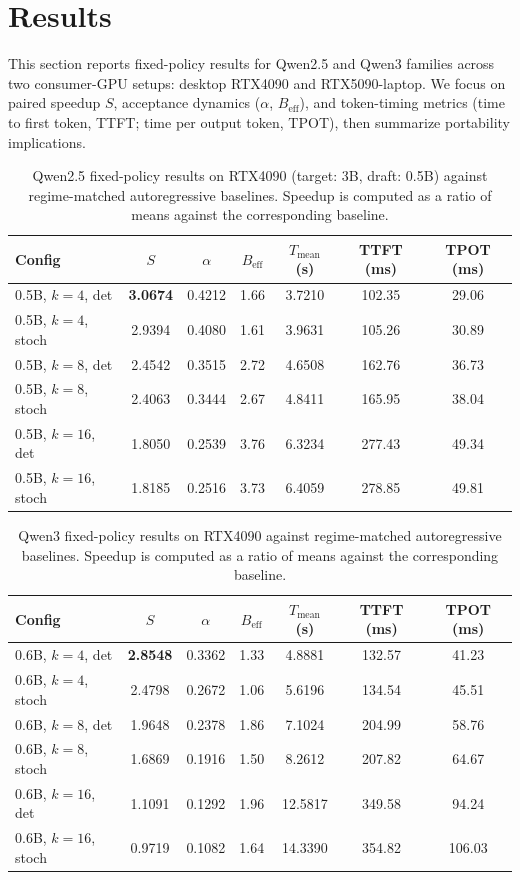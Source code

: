 \section{Results}
\label{sec:results}

This section reports fixed-policy results for Qwen2.5 and Qwen3 families
across two consumer-GPU setups: desktop RTX4090 and RTX5090-laptop.
We focus on paired speedup $S$, acceptance dynamics ($\alpha$, $B_{\text{eff}}$),
and token-timing metrics (time to first token, TTFT; time per output token,
TPOT), then summarize portability implications.

\begin{table}[t]
\centering
\caption{Qwen2.5 fixed-policy results on RTX4090 (target: 3B, draft: 0.5B) against regime-matched autoregressive baselines.
Speedup is computed as a ratio of means against the corresponding baseline.}
\label{tab:headline-4090-qwen25}
\small
\begin{tabular}{l c c c c c c}
\hline
\textbf{Config} & $S$ & $\alpha$ & $B_{\text{eff}}$ & $T_{\text{mean}}$ (s) & TTFT (ms) & TPOT (ms) \\
\hline
0.5B, $k{=}4$, det   & \textbf{3.0674} & 0.4212 & 1.66 & 3.7210 & 102.35 & 29.06 \\
0.5B, $k{=}4$, stoch & 2.9394 & 0.4080 & 1.61 & 3.9631 & 105.26 & 30.89 \\
0.5B, $k{=}8$, det   & 2.4542 & 0.3515 & 2.72 & 4.6508 & 162.76 & 36.73 \\
0.5B, $k{=}8$, stoch & 2.4063 & 0.3444 & 2.67 & 4.8411 & 165.95 & 38.04 \\
0.5B, $k{=}16$, det  & 1.8050 & 0.2539 & 3.76 & 6.3234 & 277.43 & 49.34 \\
0.5B, $k{=}16$, stoch& 1.8185 & 0.2516 & 3.73 & 6.4059 & 278.85 & 49.81 \\
\hline
\end{tabular}
\end{table}

\begin{table}[t]
\centering
\caption{Qwen3 fixed-policy results on RTX4090 against regime-matched autoregressive baselines.
Speedup is computed as a ratio of means against the corresponding baseline.}
\label{tab:headline-4090}
\small
\begin{tabular}{l c c c c c c}
\hline
\textbf{Config} & $S$ & $\alpha$ & $B_{\text{eff}}$ & $T_{\text{mean}}$ (s) & TTFT (ms) & TPOT (ms) \\
\hline
0.6B, $k{=}4$, det   & \textbf{2.8548} & 0.3362 & 1.33 & 4.8881 & 132.57 & 41.23 \\
0.6B, $k{=}4$, stoch & 2.4798 & 0.2672 & 1.06 & 5.6196 & 134.54 & 45.51 \\
0.6B, $k{=}8$, det   & 1.9648 & 0.2378 & 1.86 & 7.1024 & 204.99 & 58.76 \\
0.6B, $k{=}8$, stoch & 1.6869 & 0.1916 & 1.50 & 8.2612 & 207.82 & 64.67 \\
0.6B, $k{=}16$, det  & 1.1091 & 0.1292 & 1.96 & 12.5817 & 349.58 & 94.24 \\
0.6B, $k{=}16$, stoch& 0.9719 & 0.1082 & 1.64 & 14.3390 & 354.82 & 106.03 \\
\hline
\end{tabular}
\end{table}

